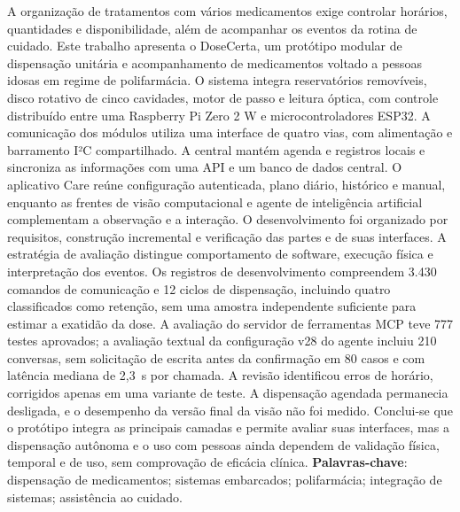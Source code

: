 \begin{resumo}
A organização de tratamentos com vários medicamentos exige controlar horários, quantidades e disponibilidade, além de acompanhar os eventos da rotina de cuidado. Este trabalho apresenta o DoseCerta, um protótipo modular de dispensação unitária e acompanhamento de medicamentos voltado a pessoas idosas em regime de polifarmácia. O sistema integra reservatórios removíveis, disco rotativo de cinco cavidades, motor de passo e leitura óptica, com controle distribuído entre uma Raspberry Pi Zero 2 W e microcontroladores ESP32. A comunicação dos módulos utiliza uma interface de quatro vias, com alimentação e barramento I²C compartilhado. A central mantém agenda e registros locais e sincroniza as informações com uma API e um banco de dados central. O aplicativo Care reúne configuração autenticada, plano diário, histórico e manual, enquanto as frentes de visão computacional e agente de inteligência artificial complementam a observação e a interação. O desenvolvimento foi organizado por requisitos, construção incremental e verificação das partes e de suas interfaces. A estratégia de avaliação distingue comportamento de software, execução física e interpretação dos eventos.
Os registros de desenvolvimento compreendem 3.430 comandos de comunicação e 12 ciclos de dispensação, incluindo quatro classificados como retenção, sem uma amostra independente suficiente para estimar a exatidão da dose. A avaliação do servidor de ferramentas MCP teve 777 testes aprovados; a avaliação textual da configuração v28 do agente incluiu 210 conversas, sem solicitação de escrita antes da confirmação em 80 casos e com latência mediana de 2,3~s por chamada. A revisão identificou erros de horário, corrigidos apenas em uma variante de teste. A dispensação agendada permanecia desligada, e o desempenho da versão final da visão não foi medido. Conclui-se que o protótipo integra as principais camadas e permite avaliar suas interfaces, mas a dispensação autônoma e o uso com pessoas ainda dependem de validação física, temporal e de uso, sem comprovação de eficácia clínica.
\vspace{\onelineskip}\noindent\textbf{Palavras-chave}: dispensação de medicamentos; sistemas embarcados; polifarmácia; integração de sistemas; assistência ao cuidado.
\end{resumo}
